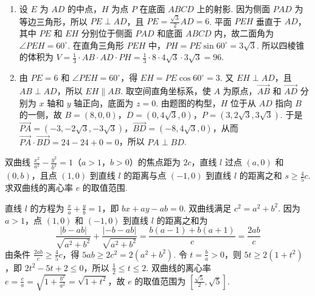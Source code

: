 \begin{solution}
\begin{enumerate}
\item 设 \(E\) 为 \(AD\) 的中点，\(H\) 为点 \(P\) 在底面 \(ABCD\) 上的射影. 因为侧面 \(PAD\) 为等边三角形，所以 \(PE\perp AD\)，且 \(PE=\frac{\sqrt{3}}{2}AD=6\). 平面 \(PEH\) 垂直于 \(AD\)，其中 \(PE\) 和 \(EH\) 分别位于侧面 \(PAD\) 和底面 \(ABCD\) 内，故二面角为 \(\angle PEH=60^{\circ}\). 在直角三角形 \(PEH\) 中，\(PH=PE\sin60^{\circ}=3\sqrt{3}\). 所以四棱锥的体积为 \(V=\frac{1}{3}\cdot AB\cdot AD\cdot PH=\frac{1}{3}\cdot8\cdot4\sqrt{3}\cdot3\sqrt{3}=96\).
\item 由 \(PE=6\) 和 \(\angle PEH=60^{\circ}\)，得 \(EH=PE\cos60^{\circ}=3\). 又 \(EH\perp AD\)，且 \(AB\perp AD\)，所以 \(EH\parallel AB\). 取空间直角坐标系，使 \(A\) 为原点，\(\overrightarrow{AB}\) 和 \(\overrightarrow{AD}\) 分别为 \(x\) 轴和 \(y\) 轴正向，底面为 \(z=0\). 由题图的构型，\(H\) 位于从 \(AD\) 指向 \(B\) 的一侧，故 \(B=(8,0,0)\)，\(D=(0,4\sqrt{3},0)\)，\(P=(3,2\sqrt{3},3\sqrt{3})\). 于是 \(\overrightarrow{PA}=(-3,-2\sqrt{3},-3\sqrt{3})\)，\(\overrightarrow{BD}=(-8,4\sqrt{3},0)\)，从而 \(\overrightarrow{PA}\cdot\overrightarrow{BD}=24-24+0=0\)，所以 \(PA\perp BD\).
\end{enumerate}
\end{solution}

\begin{problem}
双曲线 \(\frac{x^2}{a^2} - \frac{y^2}{b^2} = 1\)（\(a > 1\)，\(b > 0\)）的焦点距为 \(2c\)，直线 \(l\) 过点 \((a,0)\) 和 \((0,b)\)，且点 \((1,0)\) 到直线 \(l\) 的距离与点 \((-1,0)\) 到直线 \(l\) 的距离之和 \(s \geqslant \frac{4}{5} c\). 求双曲线的离心率 \(e\) 的取值范围.
\end{problem}

\begin{solution}
直线 \(l\) 的方程为 \(\frac{x}{a}+\frac{y}{b}=1\)，即 \(bx+ay-ab=0\). 双曲线满足 \(c^2=a^2+b^2\). 因为 \(a>1\)，点 \((1,0)\) 和 \((-1,0)\) 到直线 \(l\) 的距离之和为
\[
\frac{|b-ab|}{\sqrt{a^2+b^2}}+\frac{|-b-ab|}{\sqrt{a^2+b^2}}=\frac{b(a-1)+b(a+1)}{c}=\frac{2ab}{c}
\]
由条件 \(\frac{2ab}{c}\geqslant\frac{4}{5}c\)，得 \(5ab\geqslant2c^2=2(a^2+b^2)\).
令 \(t=\frac{b}{a}>0\)，则 \(5t\geqslant2(1+t^2)\)，即 \(2t^2-5t+2\leqslant0\)，所以 \(\frac{1}{2}\leqslant t\leqslant2\).
双曲线的离心率 \(e=\frac{c}{a}=\sqrt{1+\frac{b^2}{a^2}}=\sqrt{1+t^2}\)，故 \(e\) 的取值范围为 \(\left[\frac{\sqrt{5}}{2},\sqrt{5}\right]\).
\end{solution}
